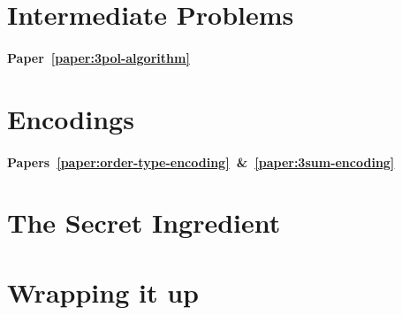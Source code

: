 \section*{Intermediate Problems}

\paragraph{Paper~\ref{paper:3pol-algorithm}}


\section*{Encodings}

\paragraph{Papers~\ref{paper:order-type-encoding}~\&~\ref{paper:3sum-encoding}}


\section*{The Secret Ingredient}


\section*{Wrapping it up}

